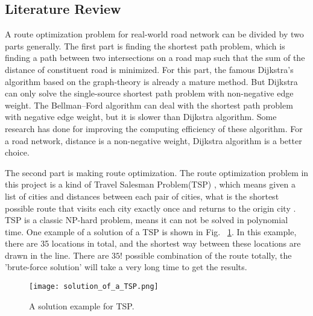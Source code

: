 \documentclass[final-report]{report-template}
\begin{document}
\subsection {Literature Review}
A route optimization problem for real-world road network can be divided by two parts generally.
The first part is finding the shortest path problem, 
which is finding a path between two intersections on a road map such that the sum of the distance of constituent road is minimized.
For this part, the famous Dijkstra's algorithm\cite{Dijkstra:1959aa} based on the graph-theory is already a mature method.
But Dijkstra can only solve the single-source shortest path problem  with non-negative edge weight.
The Bellman–Ford algorithm\cite{bellman} can deal with the shortest path problem with negative edge weight, 
but it is slower than Dijkstra algorithm.
Some research has done for improving the computing efficiency of these algorithm\cite{journals/tpds/BusatoB16}.
For a road network, distance is a non-negative weight, Dijkstra algorithm is a better choice.

The second part is making route optimization. 
The route optimization problem in this project is a kind of Travel Salesman Problem(TSP) \cite{lawler1985travelling}, 
which means given a list of cities and distances between each pair of cities, what is the shortest possible
route that visits each city exactly once and returns to the origin city \cite{TSP_wiki}. 
TSP is a classic NP-hard problem, means it can not be solved in polynomial time.
One example of a solution of a TSP is shown in Fig.~ \ref{fig:solution_of_TSP}.
In this example, there are 35 locations in total, and the shortest way between these locations are drawn in the line.
There are $35!$ possible combination of the route totally, the 'brute-force solution' will take a very long time to get the results.
\begin{figure}[H]
    \begin{center}
        \texttt{[image: solution\_of\_a\_TSP.png]}
    \end{center}
    \caption{\label{fig:solution_of_TSP} A solution example for TSP.}
\end{figure}
\end{document}

